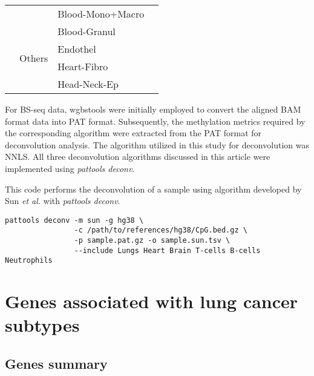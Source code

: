 \documentclass[12pt,letterpaper]{article}
\begin{document}
\begin{table}[htbp]
\begin{center}
\begin{tabular}{|l|l|l|l|}
            \cline{3-4}                             &                                             & Blood-Mono+Macro         &               \\
            \cline{3-4}                             &                                             & Blood-Granul             &               \\
            \cline{2-4}                             & \multirow{2}{*}{Others}                     & Endothel                 &               \\
            \cline{3-4}                             &                                             & Heart-Fibro              &               \\
            \cline{3-4}                             &                                             & Head-Neck-Ep             &               \\
            \hline
        \end{tabular}
    \end{center}
    \label{tab:deconvolution}
\end{table}

For BS-seq data, wgbstools\cite{Loyfer2024.05.08.593132} were initially employed to convert the
aligned BAM format data into PAT format. Subsequently, the methylation metrics required by the corresponding
algorithm were extracted from the PAT format for deconvolution analysis. The algorithm utilized in this
study for deconvolution was NNLS. All three deconvolution algorithms discussed in this article were
implemented using \textit{pattools deconv}.

This code performs the deconvolution of a sample using algorithm developed by Sun \textit{et al.} with \textit{pattools deconv}.

\begin{verbatim}
pattools deconv -m sun -g hg38 \
                -c /path/to/references/hg38/CpG.bed.gz \
                -p sample.pat.gz -o sample.sun.tsv \
                --include Lungs Heart Brain T-cells B-cells Neutrophils
\end{verbatim}

\section{Genes associated with lung cancer subtypes}\label{sec:genes}

\subsection{Genes summary}\label{sec:genes-summary}
\end{document}
